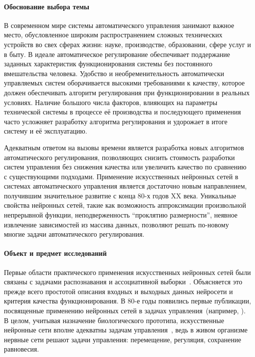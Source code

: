 
\paragraph{Обоснование выбора темы}

В современном мире системы автоматического управления занимают важное
место, обусловленное широким распространением сложных технических
устройств во свех сферах жизни: науке, производстве, образовании,
сфере услуг и в быту.  В идеале автоматическое регулирование
обеспечивает поддержание заданных характеристик функционирования
системы без постоянного вмешательства человека.  Удобство и
необременительность автоматически управляемых систем оборачивается
высокими требованиями к качеству, которое должен обеспечивать алгоритм
регулирования при функционировании в реальных условиях.  Наличие
большого числа факторов, влияющих на параметры технической системы в
процессе её производства и последующего применения часто усложняет
разработку алгоритма регулирования и удорожает в итоге систему и её
эксплуатацию.

Адекватным ответом на вызовы времени является разработка новых
алгоритмов автоматического регулирования, позволяющих снизить
стоимость разработки систем управления без снижения качества или
увеличить качество по сравнению с существующими подходами.  Применение
искусственных нейронных сетей в системах автоматического управления
является достаточно новым направлением, получившим значительное
развитие с конца 80-х годов XX века.  Уникальные свойства нейронных
сетей, такие как возможность аппроксимации произвольной непрерывной
функции, неподверженность ``проклятию размерности'', неявное
извлечение зависимостей из массива данных, позволяют решать по-новому
многие задачи автоматического регулирования.

\paragraph{Объект и предмет исследований}


Первые области практического применения искусственных нейронных сетей
были связаны с задачами распознавания и ассоциативной
выборки~\cite{wasser92,koh80,gal74}.  Объясняется это прежде всего
простотой описания входных и выходных данных нейросети и критерия
качества функционирования.  В 80-е годы появились первые публикации,
посвященные применению нейронных сетей в задачах управления~(например,
\cite{barto83}).  В целом, учитывая назначение биологического
прототипа, искусственные нейронные сети вполне адекватны задачам
управления~\cite{bondlog97}, ведь в живом организме нервные сети
решают задачи управления: перемещение, регуляция, сохранение
равновесия.

